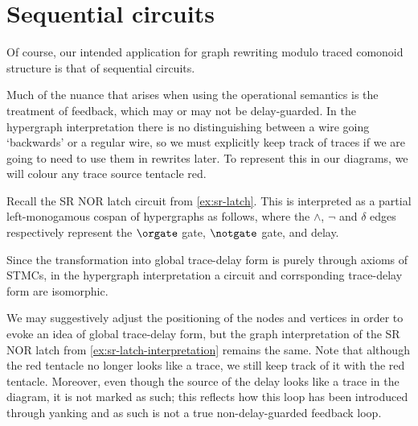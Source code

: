 \section{Sequential circuits}

Of course, our intended application for graph rewriting modulo traced
comonoid structure is that of sequential circuits.

Much of the nuance that arises when using the operational semantics is the
treatment of feedback, which may or may not be delay-guarded.
In the hypergraph interpretation there is no distinguishing between a wire going
`backwards' or a regular wire, so we must explicitly keep track of traces if we
are going to need to use them in rewrites later.
To represent this in our diagrams, we will colour any trace source tentacle red.

\begin{example}\label{ex:sr-latch-interpretation}
    Recall the SR NOR latch circuit from \cref{ex:sr-latch}.
    This is interpreted as a partial left-monogamous cospan of hypergraphs as
    follows, where the \(\wedge\), \(\neg\) and \(\delta\) edges respectively
    represent the \(\orgate\) gate, \(\notgate\) gate, and delay.
    \begin{center}
    \end{center}
\end{example}

Since the transformation into global trace-delay form is purely through axioms
of STMCs, in the hypergraph interpretation a circuit and corrsponding
trace-delay form are isomorphic.

\begin{example}
    We may suggestively adjust the positioning of the nodes and vertices in
    order to evoke an idea of global trace-delay form, but the graph
    interpretation of the SR NOR latch from \cref{ex:sr-latch-interpretation}
    remains the same.
    Note that although the red tentacle no longer looks like a trace, we still
    keep track of it with the red tentacle.
    Moreover, even though the source of the delay looks like a trace in the
    diagram, it is not marked as such; this reflects how this loop has been
    introduced through yanking and as such is not a true non-delay-guarded
    feedback loop.
    \begin{center}
    \end{center}
\end{example}

